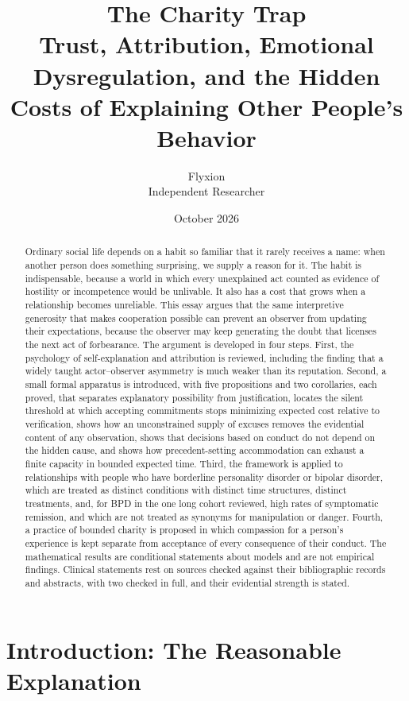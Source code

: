 \documentclass[11pt]{article}
\title{The Charity Trap\\[0.3em]\large Trust, Attribution, Emotional Dysregulation, and the Hidden Costs of Explaining Other People's Behavior}
\author{Flyxion\\Independent Researcher}
\date{October 2026}
\theoremstyle{definition}
\theoremstyle{remark}
\begin{document}
\maketitle

\begin{abstract}
\noindent Ordinary social life depends on a habit so familiar that it rarely receives a name: when another person does something surprising, we supply a reason for it. The habit is indispensable, because a world in which every unexplained act counted as evidence of hostility or incompetence would be unlivable. It also has a cost that grows when a relationship becomes unreliable. This essay argues that the same interpretive generosity that makes cooperation possible can prevent an observer from updating their expectations, because the observer may keep generating the doubt that licenses the next act of forbearance. The argument is developed in four steps. First, the psychology of self-explanation and attribution is reviewed, including the finding that a widely taught actor--observer asymmetry is much weaker than its reputation. Second, a small formal apparatus is introduced, with five propositions and two corollaries, each proved, that separates explanatory possibility from justification, locates the silent threshold at which accepting commitments stops minimizing expected cost relative to verification, shows how an unconstrained supply of excuses removes the evidential content of any observation, shows that decisions based on conduct do not depend on the hidden cause, and shows how precedent-setting accommodation can exhaust a finite capacity in bounded expected time. Third, the framework is applied to relationships with people who have borderline personality disorder or bipolar disorder, which are treated as distinct conditions with distinct time structures, distinct treatments, and, for BPD in the one long cohort reviewed, high rates of symptomatic remission, and which are not treated as synonyms for manipulation or danger. Fourth, a practice of bounded charity is proposed in which compassion for a person's experience is kept separate from acceptance of every consequence of their conduct. The mathematical results are conditional statements about models and are not empirical findings. Clinical statements rest on sources checked against their bibliographic records and abstracts, with two checked in full, and their evidential strength is stated.
\end{abstract}

\section{Introduction: The Reasonable Explanation}
\end{document}

